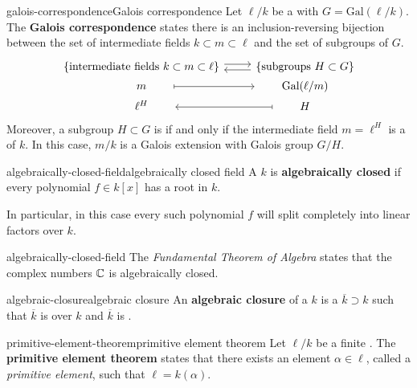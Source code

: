 \begin{topic}{galois-correspondence}{Galois correspondence}
    Let $\ell/k$ be a  with  $G = \text{Gal}(\ell/k)$. The \textbf{Galois correspondence} states there is an inclusion-reversing bijection between the set of intermediate fields $k \subset m \subset \ell$ and the set of subgroups of $G$.
    \[ \begin{tikzcd}[row sep=0em]
        \{ \text{intermediate fields } k \subset m \subset \ell \} \arrow[shift left=0.25em]{r} & \arrow[shift left=0.25em]{l} \{ \text{subgroups } H \subset G \} \\
        \qquad m \qquad  \arrow[mapsto]{r} & \qquad \text{Gal}(\ell/m) \qquad \\
        \qquad \ell^H \qquad & \arrow[mapsto]{l} \qquad H \qquad 
    \end{tikzcd} \]
    Moreover, a subgroup $H \subset G$ is  if and only if the intermediate field $m = \ell^H$ is a  of $k$. In this case, $m/k$ is a Galois extension with Galois group $G/H$.
\end{topic}

\begin{topic}{algebraically-closed-field}{algebraically closed field}
    A  $k$ is \textbf{algebraically closed} if every polynomial $f \in k[x]$ has a root in $k$.
    
    In particular, in this case every such polynomial $f$ will split completely into linear factors over $k$.
\end{topic}

\begin{example}{algebraically-closed-field}
    The \textit{Fundamental Theorem of Algebra} states that the complex numbers $\mathbb{C}$ is algebraically closed.
\end{example}

\begin{topic}{algebraic-closure}{algebraic closure}
    An \textbf{algebraic closure} of a  $k$ is a  $\overline{k} \supset k$ such that $\overline{k}$ is  over $k$ and $\overline{k}$ is .
\end{topic}

\begin{topic}{primitive-element-theorem}{primitive element theorem}
    Let $\ell/k$ be a finite . The \textbf{primitive element theorem} states that there exists an element $\alpha \in \ell$, called a \textit{primitive element}, such that $\ell = k(\alpha)$.
\end{topic}

